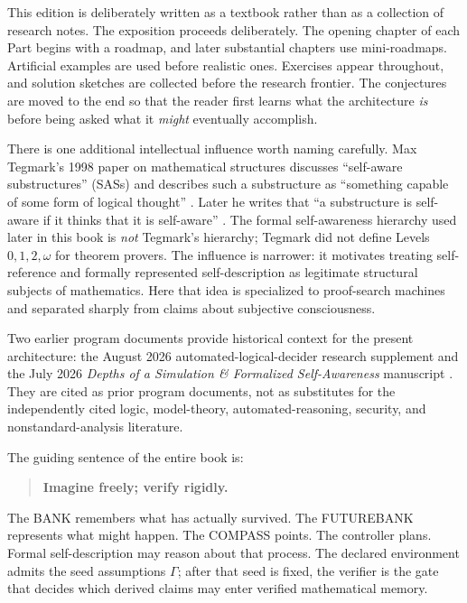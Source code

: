 \documentclass[11pt,openany]{book}
\theoremstyle{definition}
\theoremstyle{remark}
\begin{document}
This edition is deliberately written as a textbook rather than as a collection of research notes. The exposition proceeds deliberately. The opening chapter of each Part begins with a roadmap, and later substantial chapters use mini-roadmaps. Artificial examples are used before realistic ones. Exercises appear throughout, and solution sketches are collected before the research frontier. The conjectures are moved to the end so that the reader first learns what the architecture \emph{is} before being asked what it \emph{might} eventually accomplish.

There is one additional intellectual influence worth naming carefully. Max Tegmark's 1998 paper on mathematical structures discusses ``self-aware substructures'' (SASs) and describes such a substructure as ``something capable of some form of logical thought'' \cite{Tegmark1998}. Later he writes that ``a substructure is self-aware if it thinks that it is self-aware'' \cite{Tegmark1998}. The formal self-awareness hierarchy used later in this book is \emph{not} Tegmark's hierarchy; Tegmark did not define Levels $0,1,2,\omega$ for theorem provers. The influence is narrower: it motivates treating self-reference and formally represented self-description as legitimate structural subjects of mathematics. Here that idea is specialized to proof-search machines and separated sharply from claims about subjective consciousness.

Two earlier program documents provide historical context for the present architecture: the August 2026 automated-logical-decider research supplement and the July 2026 \emph{Depths of a Simulation \& Formalized Self-Awareness} manuscript \cite{TennesonALD2026,TennesonDepths2026}. They are cited as prior program documents, not as substitutes for the independently cited logic, model-theory, automated-reasoning, security, and nonstandard-analysis literature.

The guiding sentence of the entire book is:
\begin{quote}
\textbf{Imagine freely; verify rigidly.}
\end{quote}
The BANK remembers what has actually survived. The FUTUREBANK represents what might happen. The COMPASS points. The controller plans. Formal self-description may reason about that process. The declared environment admits the seed assumptions $\Gamma$; after that seed is fixed, the verifier is the gate that decides which derived claims may enter verified mathematical memory.
\end{document}
